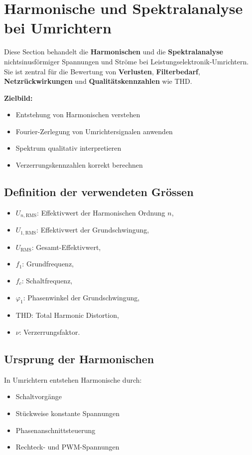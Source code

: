 \section{Harmonische und Spektralanalyse bei Umrichtern}

Diese Section behandelt die \textbf{Harmonischen} und die \textbf{Spektralanalyse}
nichtsinusförmiger Spannungen und Ströme bei Leistungselektronik-Umrichtern.
Sie ist zentral für die Bewertung von \textbf{Verlusten}, \textbf{Filterbedarf},
\textbf{Netzrückwirkungen} und \textbf{Qualitätskennzahlen} wie THD.

\smallskip

\textbf{Zielbild:}
\begin{itemize}
    \item Entstehung von Harmonischen verstehen
    \item Fourier-Zerlegung von Umrichtersignalen anwenden
    \item Spektrum qualitativ interpretieren
    \item Verzerrungskennzahlen korrekt berechnen
\end{itemize}
\subsection*{Definition der verwendeten Grössen}

\begin{itemize}
    \item $U_{n,\mathrm{RMS}}$: Effektivwert der Harmonischen Ordnung $n$,
    \item $U_{1,\mathrm{RMS}}$: Effektivwert der Grundschwingung,
    \item $U_{\mathrm{RMS}}$: Gesamt-Effektivwert,
    \item $f_1$: Grundfrequenz,
    \item $f_c$: Schaltfrequenz,
    \item $\varphi_1$: Phasenwinkel der Grundschwingung,
    \item $\mathrm{THD}$: Total Harmonic Distortion,
    \item $\nu$: Verzerrungsfaktor.
\end{itemize}

\subsection{Ursprung der Harmonischen}

In Umrichtern entstehen Harmonische durch:
\begin{itemize}
    \item Schaltvorgänge
    \item Stückweise konstante Spannungen
    \item Phasenanschnittsteuerung
    \item Rechteck- und PWM-Spannungen
\end{itemize}

